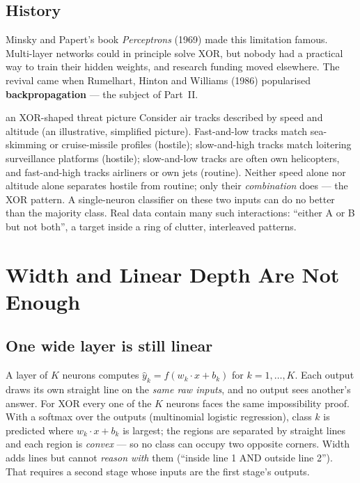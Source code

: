 \documentclass[11pt]{article}
\begin{document}
\subsection{History}
Minsky and Papert's book \emph{Perceptrons} (1969) made this limitation famous. Multi-layer networks could in principle solve XOR, but nobody had a practical way to train their hidden weights, and research funding moved elsewhere. The revival came when Rumelhart, Hinton and Williams (1986) popularised \textbf{backpropagation} --- the subject of Part~II.

\begin{defence}{an XOR-shaped threat picture}
Consider air tracks described by speed and altitude (an illustrative, simplified picture). Fast-and-low tracks match sea-skimming or cruise-missile profiles (hostile); slow-and-high tracks match loitering surveillance platforms (hostile); slow-and-low tracks are often own helicopters, and fast-and-high tracks airliners or own jets (routine). Neither speed alone nor altitude alone separates hostile from routine; only their \emph{combination} does --- the XOR pattern. A single-neuron classifier on these two inputs can do no better than the majority class. Real data contain many such interactions: ``either A or B but not both'', a target inside a ring of clutter, interleaved patterns.
\end{defence}

\section{Width and Linear Depth Are Not Enough}
\subsection{One wide layer is still linear}
A layer of $K$ neurons computes $\hat y_k=f(w_k\cdot x+b_k)$ for $k=1,\dots,K$. Each output draws its own straight line on the \emph{same raw inputs}, and no output sees another's answer. For XOR every one of the $K$ neurons faces the same impossibility proof. With a softmax over the outputs (multinomial logistic regression), class $k$ is predicted where $w_k\cdot x+b_k$ is largest; the regions are separated by straight lines and each region is \emph{convex} --- so no class can occupy two opposite corners. Width adds lines but cannot \emph{reason with} them (``inside line 1 AND outside line 2''). That requires a second stage whose inputs are the first stage's outputs.
\end{document}

